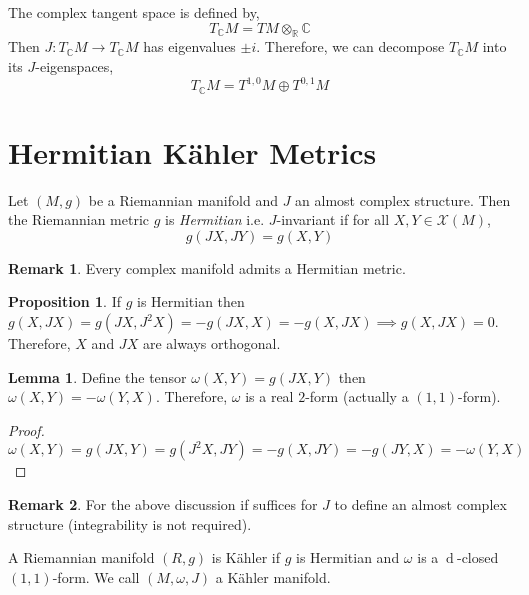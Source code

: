 \documentclass[12pt]{extarticle}
\newcommand{\R}{\mathbb{R}}
\newcommand{\C}{\mathbb{C}}
\renewcommand{\d}[1]{\: \mathrm{d}#1 \:}
\theoremstyle{definition}
\newtheorem{lemma}[theorem]{Lemma}
\newtheorem{proposition}[theorem]{Proposition}
\newtheorem{remark}{Remark}
\newenvironment{definition}[1][Definition:]{\begin{trivlist}
\item[\hskip \labelsep {\bfseries #1}]}{\end{trivlist}}
\begin{document}
\begin{definition}
The complex tangent space is defined by,
\[ T_\C M = TM \otimes_{\R} \C \]
Then $J : T_\C M \to T_\C M$ has eigenvalues $\pm i$. Therefore, we can decompose $T_\C M$ into its $J$-eigenspaces,
\[ T_\C M = T^{1,0} M \oplus T^{0, 1} M \]
\end{definition}

\section{Hermitian K\"{a}hler Metrics}

\begin{definition}
Let $(M, g)$ be a Riemannian manifold and $J$ an almost complex structure. Then the Riemannian metric $g$ is \textit{Hermitian} i.e. $J$-invariant if for all $X, Y \in \mathscr{X}(M)$,
\[ g(J X, J Y) = g(X, Y) \] 
\end{definition}

\begin{remark}
Every complex manifold admits a Hermitian metric.
\end{remark}

\begin{proposition}
If $g$ is Hermitian then $g(X, JX) = g(JX, J^2 X) = - g(JX, X) = - g(X, J X) \implies g(X, JX) = 0$. Therefore, $X$ and $JX$ are always orthogonal. 
\end{proposition}

\begin{lemma}
Define the tensor $\omega(X, Y) = g(JX, Y)$ then $\omega(X, Y) = - \omega(Y, X)$. Therefore, $\omega$ is a real $2$-form (actually a $(1,1)$-form). 
\end{lemma}

\begin{proof}
\[ \omega(X, Y) = g(J X, Y) = g(J^2 X, J Y) = - g(X, J Y) = - g(JY, X) = - \omega(Y, X) \]
\end{proof}

\begin{remark}
For the above discussion if suffices for $J$ to define an almost complex structure (integrability is not required). 
\end{remark}

\begin{definition}
A Riemannian manifold $(R, g)$ is K\"{a}hler if $g$ is Hermitian and $\omega$ is a $\d{}$-closed $(1,1)$-form. We call $(M, \omega, J)$ a K\"{a}hler manifold. 
\end{definition}
\end{document}
